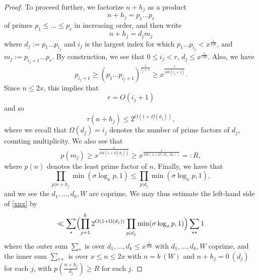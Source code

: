 \documentclass{bmcart}
\theoremstyle{plain}
\theoremstyle{definition}
\begin{document}
\begin{proof}
To proceed further, we factorize $n+h_j$ as a product
$$ n+h_j = p_1 \dots p_r$$
of primes $p_1 \leq \dots \leq p_r$ in increasing order, and then write 
$$ n+h_j = d_j m_j$$
where $d_j := p_1 \dots p_{i_j}$ and $i_j$ is the largest index for which $p_1 \dots p_{i_j} < x^{\frac{1}{10k}}$, and $m_j := p_{i_j+1} \dots p_r$.  By construction, we see that $0 \leq i_j < r$, $d_j \leq x^{\frac{1}{10k}}$.  Also, we have
$$ p_{i_j+1} \geq (p_1 \dots p_{i_j+1})^{\frac{1}{i_j+1}} \geq x^{\frac{1}{10k(i_j+1)}}.$$
Since $n \leq 2x$, this implies that
$$ r = O( i_j + 1 )$$
and so
$$ \tau(n+h_j) \leq 2^{O(1+\Omega(d_j))},$$
where we recall that $\Omega(d_j) = i_j$ denotes the number of prime factors of $d_j$, counting multiplicity. We also see that
$$ p(m_j) \geq x^{\frac{1}{10k(1+\Omega(d_j))}}\geq x^{\frac{1}{10k(1+\Omega(d_1\dots d_k))}}=:R,$$
where $p(n)$ denotes the least prime factor of $n$. Finally, we have that
$$ \prod_{p|n+h_j} \min(\sigma \log_x p,1) \leq \prod_{p|d_j} \min( \sigma \log_x p, 1 ),$$
and we see the $d_1,\dots,d_k,W$ are coprime.  We may thus estimate the left-hand side of \eqref{xnx} by
$$ 
\ll \sum_* \Bigl(\prod_{j=1}^k 2^{O(1+\Omega(d_j))} \prod_{p|d_j} \min( \sigma \log_x p, 1 )\Bigr) \sum_{**} 1$$
where the outer sum $\sum_*$ is over $d_1,\dots,d_k \leq x^{\frac{1}{10k}}$ with $d_1,\dots,d_k,W$ coprime, and the inner sum $\sum_{**}$ is over $x \leq n \leq 2x$ with $n = b\ (W)$ and $n + h_j = 0\ (d_j)$ for each $j$, with $p( \frac{n+h_j}{d_j}) \geq R$ for each $j$.


\end{proof}
\end{document}
